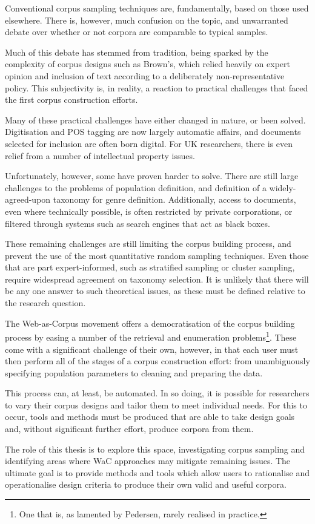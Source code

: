 
Conventional corpus sampling techniques are, fundamentally, based on those used elsewhere.  There is, however, much confusion on the topic, and unwarranted debate over whether or not corpora are comparable to typical samples.

Much of this debate has stemmed from tradition, being sparked by the complexity of corpus designs such as Brown's, which relied heavily on expert opinion and inclusion of text according to a deliberately non-representative policy.  This subjectivity is, in reality, a reaction to practical challenges that faced the first corpus construction efforts.

Many of these practical challenges have either changed in nature, or been solved.  Digitisation and POS tagging are now largely automatic affairs, and documents selected for inclusion are often born digital.  For UK researchers, there is even relief from a number of intellectual property issues.

Unfortunately, however, some have proven harder to solve.  There are still large challenges to the problems of population definition, and definition of a widely-agreed-upon taxonomy for genre definition.  Additionally, access to documents, even where technically possible, is often restricted by private corporations, or filtered through systems such as search engines that act as black boxes.

These remaining challenges are still limiting the corpus building process, and prevent the use of the most quantitative random sampling techniques.  Even those that are part expert-informed, such as stratified sampling or cluster sampling, require widespread agreement on taxonomy selection.  It is unlikely that there will be any one answer to such theoretical issues, as these must be defined relative to the research question.

The Web-as-Corpus movement offers a democratisation of the corpus building process by easing a number of the retrieval and enumeration problems\footnote{One that is, as lamented by Pedersen, rarely realised in practice\cite{pedersen2008empiricism}.}.  These come with a significant challenge of their own, however, in that each user must then perform all of the stages of a corpus construction effort: from unambiguously specifying population parameters to cleaning and preparing the data.

This process can, at least, be automated.  In so doing, it is possible for researchers to vary their corpus designs and tailor them to meet individual needs.  For this to occur, tools and methods must be produced that are able to take design goals and, without significant further effort, produce corpora from them.

The role of this thesis is to explore this space, investigating corpus sampling and identifying areas where WaC approaches may mitigate remaining issues.  The ultimate goal is to provide methods and tools which allow users to rationalise and operationalise design criteria to produce their own valid and useful corpora.


